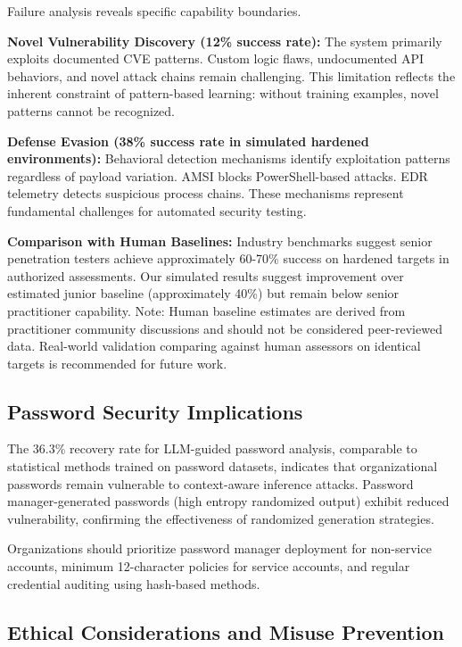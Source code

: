 \documentclass[preprint,12pt]{elsarticle}
\begin{document}
Failure analysis reveals specific capability boundaries.

\textbf{Novel Vulnerability Discovery (12\% success rate):} The system primarily exploits documented CVE patterns. Custom logic flaws, undocumented API behaviors, and novel attack chains remain challenging. This limitation reflects the inherent constraint of pattern-based learning: without training examples, novel patterns cannot be recognized.

\textbf{Defense Evasion (38\% success rate in simulated hardened environments):} Behavioral detection mechanisms identify exploitation patterns regardless of payload variation. AMSI blocks PowerShell-based attacks. EDR telemetry detects suspicious process chains. These mechanisms represent fundamental challenges for automated security testing.

\textbf{Comparison with Human Baselines:} Industry benchmarks suggest senior penetration testers achieve approximately 60-70\% success on hardened targets in authorized assessments. Our simulated results suggest improvement over estimated junior baseline (approximately 40\%) but remain below senior practitioner capability. Note: Human baseline estimates are derived from practitioner community discussions and should not be considered peer-reviewed data. Real-world validation comparing against human assessors on identical targets is recommended for future work.

\subsection{Password Security Implications}

The 36.3\% recovery rate for LLM-guided password analysis, comparable to statistical methods trained on password datasets, indicates that organizational passwords remain vulnerable to context-aware inference attacks. Password manager-generated passwords (high entropy randomized output) exhibit reduced vulnerability, confirming the effectiveness of randomized generation strategies.

Organizations should prioritize password manager deployment for non-service accounts, minimum 12-character policies for service accounts, and regular credential auditing using hash-based methods.

\subsection{Ethical Considerations and Misuse Prevention}
\label{sec:ethics}
\end{document}
